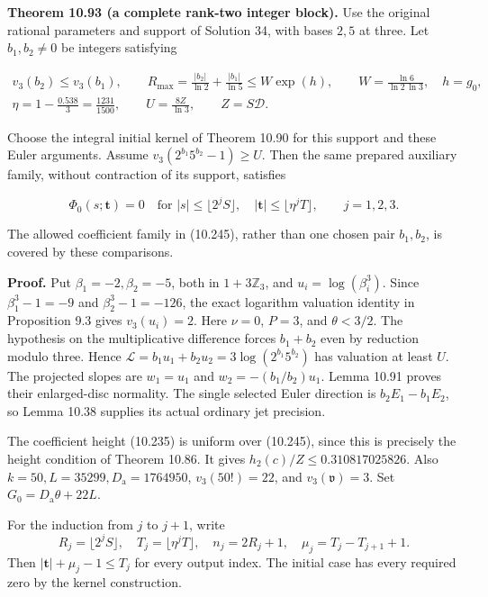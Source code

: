 \documentclass[
  11pt,
  a4paper,
]{article}
\begin{document}
\textbf{Theorem 10.93 (a complete rank-two integer block).} Use the
original rational parameters and support of Solution 34, with bases
\(2,5\) at three. Let \(b_1,b_2\ne0\) be integers satisfying

\[
\begin{gathered}
v_3(b_2)\le v_3(b_1),\qquad
R_{\max}=\frac{|b_2|}{\ln2}+\frac{|b_1|}{\ln5}
\le W\exp(h),\qquad
W=\frac{\ln6}{\ln2\,\ln3},\quad h=g_0,\\
\eta=1-\frac{0.538}{3}=\frac{1231}{1500},
\qquad U=\frac{8Z}{\ln3},\qquad Z=S\mathcal D .
\end{gathered}
\tag{10.245}
\]

Choose the integral initial kernel of Theorem 10.90 for this support and
these Euler arguments. Assume \(v_3(2^{b_1}5^{b_2}-1)\ge U\). Then the
same prepared auxiliary family, without contraction of its support,
satisfies

\[
\Phi_0(s;\boldsymbol t)=0
\quad\text{for }|s|\le\lfloor2^jS\rfloor,\quad
|\boldsymbol t|\le\lfloor\eta^jT\rfloor,\qquad j=1,2,3.
\tag{10.246}
\]

The allowed coefficient family in (10.245), rather than one chosen pair
\(b_1,b_2\), is covered by these comparisons.

\textbf{Proof.} Put \(\beta_1=-2,\beta_2=-5\), both in
\(1+3\mathbb Z_3\), and \(u_i=\log(\beta_i^3)\). Since
\(\beta_1^3-1=-9\) and \(\beta_2^3-1=-126\), the exact logarithm
valuation identity in Proposition 9.3 gives \(v_3(u_i)=2\). Here
\(\nu=0\), \(P=3\), and \(\theta<3/2\). The hypothesis on the
multiplicative difference forces \(b_1+b_2\) even by reduction modulo
three. Hence \(\mathcal L=b_1u_1+b_2u_2=3\log(2^{b_1}5^{b_2})\) has
valuation at least \(U\). The projected slopes are \(w_1=u_1\) and
\(w_2=-(b_1/b_2)u_1\). Lemma 10.91 proves their enlarged-disc normality.
The single selected Euler direction is \(b_2E_1-b_1E_2\), so Lemma 10.38
supplies its actual ordinary jet precision.

The coefficient height (10.235) is uniform over (10.245), since this is
precisely the height condition of Theorem 10.86. It gives
\(h_2(c)/Z\le0.310817025826\). Also
\(k=50,L=35299,D_{\mathrm a}=1764950\), \(v_3(50!)=22\), and
\(v_3(\mathfrak v)=3\). Set \(G_0=D_{\mathrm a}\theta+22L\).

For the induction from \(j\) to \(j+1\), write \[
R_j=\lfloor2^jS\rfloor,\quad T_j=\lfloor\eta^jT\rfloor,\quad
n_j=2R_j+1,\quad \mu_j=T_j-T_{j+1}+1 .
\] Then \(|\boldsymbol t|+\mu_j-1\le T_j\) for every output index. The
initial case has every required zero by the kernel construction.
\end{document}
